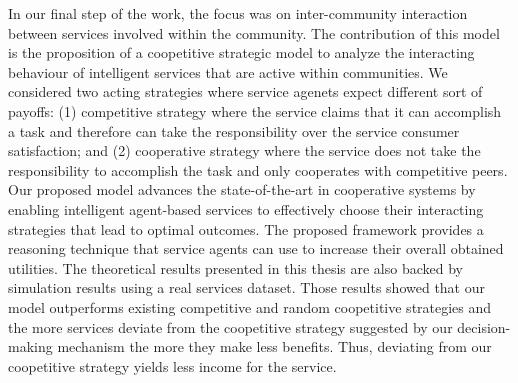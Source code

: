 In our final step of the work, the focus was on inter-community interaction between services involved within the community. The contribution of this model is the proposition of a coopetitive strategic model to analyze the interacting behaviour of intelligent services that are active within communities. We considered two acting strategies where service agenets expect different sort of payoffs: (1) competitive strategy where the service claims that it can accomplish a task and therefore can take the responsibility over the service consumer satisfaction; and (2) cooperative strategy where the service does not take the responsibility to accomplish the task and only cooperates with competitive peers. Our proposed model advances the state-of-the-art in cooperative systems by enabling intelligent agent-based services to effectively choose their interacting strategies that lead to optimal outcomes. The proposed framework provides a reasoning technique that service agents can use to increase their overall obtained utilities. The theoretical results presented in this thesis are also backed by simulation results using a real services dataset. Those results showed that our model outperforms existing competitive and random coopetitive strategies and the more
services deviate from the coopetitive strategy suggested by our decision-making mechanism the more they make less benefits. Thus, deviating from our coopetitive strategy yields less income for the service.




